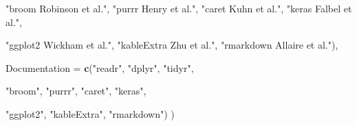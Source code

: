 \documentclass[10pt,letterpaper]{article}
\newenvironment{Shaded}{\begin{snugshade}}{\end{snugshade}}
\newcommand{\DataTypeTok}[1]{\textcolor[rgb]{0.13,0.29,0.53}{#1}}
\newcommand{\KeywordTok}[1]{\textcolor[rgb]{0.13,0.29,0.53}{\textbf{#1}}}
\newcommand{\NormalTok}[1]{#1}
\newcommand{\StringTok}[1]{\textcolor[rgb]{0.31,0.60,0.02}{#1}}
\begin{document}
\begin{Shaded}
\begin{Highlighting}[]
             \StringTok{"broom Robinson et al."}\NormalTok{,}
             \StringTok{"purrr Henry et al."}\NormalTok{,}
             \StringTok{"caret Kuhn et al."}\NormalTok{, }
             \StringTok{"keras Falbel et al."}\NormalTok{,}
                    
             \StringTok{"ggplot2 Wickham et al."}\NormalTok{,}
             \StringTok{"kableExtra Zhu et al."}\NormalTok{, }
             \StringTok{"rmarkdown Allaire et al."}\NormalTok{),}
  
  \DataTypeTok{Documentation =} \KeywordTok{c}\NormalTok{(}\StringTok{"readr"}\NormalTok{, }
                    \StringTok{"dplyr"}\NormalTok{, }
                    \StringTok{"tidyr"}\NormalTok{,}
  
                    \StringTok{"broom"}\NormalTok{,}
                    \StringTok{"purrr"}\NormalTok{,}
                    \StringTok{"caret"}\NormalTok{, }
                    \StringTok{"keras"}\NormalTok{,}
                    
                    \StringTok{"ggplot2"}\NormalTok{,}
                    \StringTok{"kableExtra"}\NormalTok{, }
                    \StringTok{"rmarkdown"}\NormalTok{)}
\NormalTok{)}
\end{Highlighting}
\end{Shaded}
\end{document}
